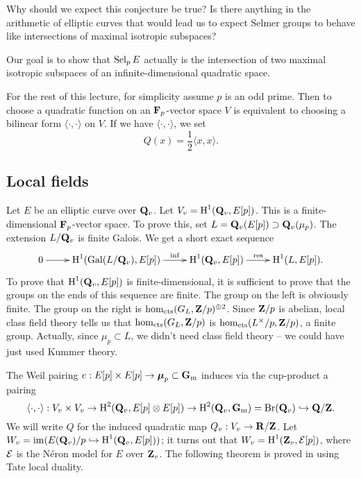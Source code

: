 Why should we expect this conjecture be true? Is there anything in the 
arithmetic of elliptic curves that would lead us to expect Selmer groups to 
behave like intersections of maximal isotropic subspaces? 

Our goal is to show that $\operatorname{Sel}_p E$ actually is the intersection of two 
maximal isotropic subspaces of an infinite-dimensional quadratic space. 

For the rest of this lecture, for simplicity assume $p$ is an odd prime. Then 
to choose a quadratic function on an $\mathbf{F}_p$-vector space $V$ is equivalent 
to choosing a bilinear form $\langle \cdot,\cdot\rangle$ on $V$. If we have 
$\langle\cdot,\cdot\rangle$, we set 
\[
  Q(x) = \frac 1 2 \langle x,x\rangle.
\]





\subsection{Local fields}

Let $E$ be an elliptic curve over $\mathbf{Q}_v$. Let $V_v = \operatorname{H}^1(\mathbf{Q}_v,E[p])$. This 
is a finite-dimensional $\mathbf{F}_p$-vector space. To prove this, set 
$L=\mathbf{Q}_v(E[p])\supset \mathbf{Q}_v(\mu_p)$. The extension $L/\mathbf{Q}_v$ is finite Galois. 
We get a short exact sequence 
\[\xymatrix{
  0 \ar[r] 
    & \h^1(\galois(L/\dQ_v),E[p]) \ar[r]^-{\mathrm{inf}} 
    & \h^1(\dQ_v,E[p]) \ar[r]^-{\mathrm{res}} 
    & \h^1(L,E[p]) .
}\]
To prove that $\operatorname{H}^1(\mathbf{Q}_v,E[p])$ is finite-dimensional, it is sufficient to 
prove that the groups on the ends of this sequence are finite. 
The group on the left is obviously finite. The group on the right is 
$\hom_\mathrm{cts}(G_L,\mathbf{Z}/p)^{\oplus 2}$. Since $\mathbf{Z}/p$ is abelian, local 
class field theory tells us that $\hom_\mathrm{cts}(G_L,\mathbf{Z}/p)$ is 
$\hom_\mathrm{cts}(L^\times / p,\mathbf{Z}/p)$, a finite group. Actually, since 
$\mu_p\subset L$, we didn't need class field theory -- we could have just used 
Kummer theory. 

The Weil pairing 
$e:E[p]\times E[p] \to \boldsymbol\mu_p\subset \mathbf{G}_{\mathrm{m}}$ induces via 
the cup-product a pairing 
\[
  \langle \cdot,\cdot\rangle:V_v\times V_v \to \operatorname{H}^2(\mathbf{Q}_v,E[p]\otimes E[p]) \to \operatorname{H}^2(\mathbf{Q}_v,\mathbf{G}_{\mathrm{m}}) = \operatorname{Br}(\mathbf{Q}_v)\hookrightarrow \mathbf{Q}/\mathbf{Z} .
\]
We will write $Q$ for the induced quadratic map $Q_v:V_v\to \mathbf{R}/\mathbf{Z}$. Let 
$W_v = \operatorname{im}(E(\mathbf{Q}_v)/p \hookrightarrow \operatorname{H}^1(\mathbf{Q}_v,E[p]))$; it turns out that 
$W_v=\operatorname{H}^1(\mathbf{Z}_v,\mathcal{E}[p])$, where $\mathcal{E}$ is the N\'eron model for $E$ over 
$\mathbf{Z}_v$. The following theorem is proved in \cite{n02} using Tate local 
duality. 

